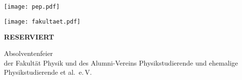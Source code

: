 \documentclass[paper=landscape]{scrartcl}
\begin{document}
\begin{minipage}{0.5\textwidth}%
  \texttt{[image: pep.pdf]}
\end{minipage}%
\begin{minipage}{0.5\textwidth}%
  \raggedleft%
  \texttt{[image: fakultaet.pdf]}
\end{minipage}%

\vspace{3cm}

\begin{center}
  \fontsize{120}{140}\selectfont\bfseries%
  RESERVIERT
\end{center}

\vfill

\begin{center}
  \huge Absolventenfeier\\
  der Fakultät Physik und des Alumni-Vereins
  Physikstudierende und ehemalige Physikstudierende et al.\ e.\,V.
\end{center}
  
\end{document}
